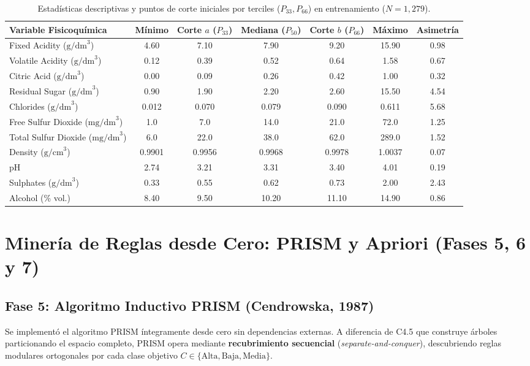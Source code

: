 \documentclass[11pt,a4paper]{article}
\begin{document}
\begin{table}[H]
\centering
\caption{Estadísticas descriptivas y puntos de corte iniciales por terciles ($P_{33}, P_{66}$) en entrenamiento ($N=1,279$).}
\label{tab:estadisticas_cortes}
\small
\begin{tabular}{lcccccc}
\toprule
\textbf{Variable Fisicoquímica} & \textbf{Mínimo} & \textbf{Corte $a$ ($P_{33}$)} & \textbf{Mediana ($P_{50}$)} & \textbf{Corte $b$ ($P_{66}$)} & \textbf{Máximo} & \textbf{Asimetría} \\
\midrule
Fixed Acidity ($\text{g/dm}^3$) & 4.60 & 7.10 & 7.90 & 9.20 & 15.90 & 0.98 \\
Volatile Acidity ($\text{g/dm}^3$) & 0.12 & 0.39 & 0.52 & 0.64 & 1.58 & 0.67 \\
Citric Acid ($\text{g/dm}^3$) & 0.00 & 0.09 & 0.26 & 0.42 & 1.00 & 0.32 \\
Residual Sugar ($\text{g/dm}^3$) & 0.90 & 1.90 & 2.20 & 2.60 & 15.50 & 4.54 \\
Chlorides ($\text{g/dm}^3$) & 0.012 & 0.070 & 0.079 & 0.090 & 0.611 & 5.68 \\
Free Sulfur Dioxide ($\text{mg/dm}^3$) & 1.0 & 7.0 & 14.0 & 21.0 & 72.0 & 1.25 \\
Total Sulfur Dioxide ($\text{mg/dm}^3$) & 6.0 & 22.0 & 38.0 & 62.0 & 289.0 & 1.52 \\
Density ($\text{g/cm}^3$) & 0.9901 & 0.9956 & 0.9968 & 0.9978 & 1.0037 & 0.07 \\
pH & 2.74 & 3.21 & 3.31 & 3.40 & 4.01 & 0.19 \\
Sulphates ($\text{g/dm}^3$) & 0.33 & 0.55 & 0.62 & 0.73 & 2.00 & 2.43 \\
Alcohol (\% vol.) & 8.40 & 9.50 & 10.20 & 11.10 & 14.90 & 0.86 \\
\bottomrule
\end{tabular}
\end{table}

\section{Minería de Reglas desde Cero: PRISM y Apriori (Fases 5, 6 y 7)}

\subsection{Fase 5: Algoritmo Inductivo PRISM (Cendrowska, 1987)}
Se implementó el algoritmo PRISM íntegramente desde cero sin dependencias externas. A diferencia de C4.5 que construye árboles particionando el espacio completo, PRISM opera mediante \textbf{recubrimiento secuencial} (\textit{separate-and-conquer}), descubriendo reglas modulares ortogonales por cada clase objetivo $C \in \{\text{Alta}, \text{Baja}, \text{Media}\}$.
\end{document}
